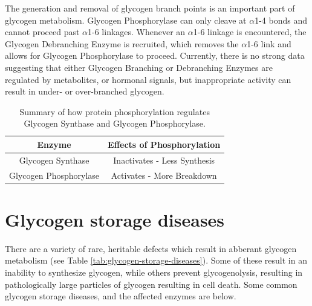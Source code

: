 \documentclass{tufte-handout}
\begin{document}
The generation and removal of glycogen branch points is an important part of glycogen metabolism.  Glycogen Phosphorylase can only cleave at $\alpha$1-4 bonds and cannot proceed past $\alpha$1-6 linkages.  Whenever an $\alpha$1-6 linkage is encountered, the Glycogen Debranching Enzyme is recruited, which removes the $\alpha$1-6 link and allows for Glycogen Phosphorylase to proceed.  Currently, there is no strong data suggesting that either Glycogen Branching or Debranching Enzymes are regulated by metabolites, or hormonal signals, but inappropriate activity can result in under- or over-branched glycogen.


\begin{table}
\centering
\caption{Summary of how protein phosphorylation regulates Glycogen Synthase and Glycogen Phosphorylase.}
\label{tab:gs-gp-phosphorylation}
\begin{tabular}{cc}
\hline
\textbf {Enzyme} & \textbf{Effects of Phosphorylation}  \\
\hline
Glycogen Synthase & Inactivates - Less Synthesis \\
Glycogen Phosphorylase & Activates - More Breakdown\\
\hline
\end{tabular}
\end{table}

\section{Glycogen storage diseases}

There are a variety of rare, heritable defects which result in abberant glycogen metabolism (see Table \ref{tab:glycogen-storage-diseases}).  Some of these result in an inability to synthesize glycogen, while others prevent glycogenolysis, resulting in pathologically large particles of glycogen resulting in cell death.  Some common glycogen storage diseases, and the affected enzymes are below.   
\end{document}
